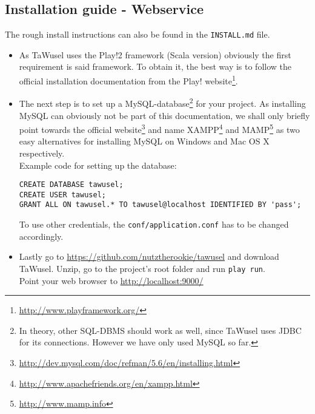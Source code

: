\subsection{Installation guide - Webservice}\label{ssec:WebInst}

The rough install instructions can also be found in the \texttt{INSTALL.md} file.
\begin{itemize}

\item As TaWusel uses the Play!2 framework (Scala version) obviously the first requirement is said framework. To obtain it, the best way is to follow the official installation documentation from the Play! website\footnote{\url{http://www.playframework.org/}}.

\item The next step is to set up a MySQL-database\footnote{In theory, other SQL-DBMS should work as well, since TaWusel uses
JDBC for its connections. However we have only used MySQL so far.} for your project.
As installing MySQL can obviously not be part of this documentation, we shall only briefly point towards the official
website\footnote{\url{http://dev.mysql.com/doc/refman/5.6/en/installing.html}} and name
XAMPP\footnote{\url{http://www.apachefriends.org/en/xampp.html}} and MAMP\footnote{\url{http://www.mamp.info}} as two easy alternatives
for installing MySQL on Windows and Mac OS X respectively.\\
Example code for setting up the database:
\begin{verbatim}
CREATE DATABASE tawusel;
CREATE USER tawusel;
GRANT ALL ON tawusel.* TO tawusel@localhost IDENTIFIED BY 'pass';
\end{verbatim}
\small{To use other credentials, the \texttt{conf/application.conf} has to be changed accordingly.}

\item Lastly go to \url{https://github.com/nutztherookie/tawusel} and download TaWusel. Unzip, go to the project's root folder and run \texttt{play run}.\\
Point your web browser to \url{http://localhost:9000/}


\end{itemize}